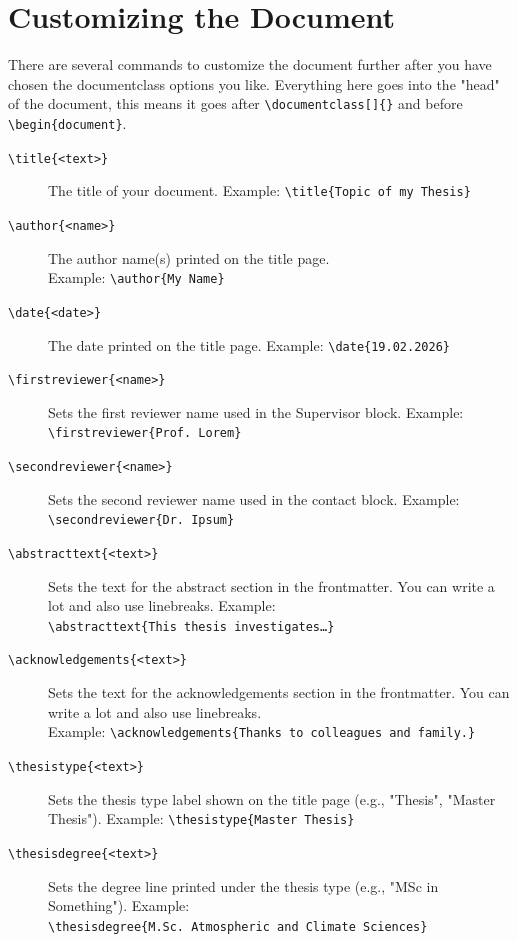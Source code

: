 \documentclass[12pt, todonotes, nodeclaration, oneside, fancypagenumbers, notof, notot, noabstract]{IAUthesis}
\newcommand{\code}[1]{\colorbox{black!10!white}{\texttt{#1}}}
\begin{document}
\chapter{Customizing the Document}
There are several commands to customize the document further after you have chosen the documentclass options you like. Everything here goes into the "head" of the document, this means it goes after \verb|\documentclass[]{}| and before \texttt{\textbackslash begin\{document\}}.

\begin{description} 
\item[\code{\textbackslash title\{<text>\}}] The title of your document. Example: \texttt{\textbackslash title\{Topic of my Thesis\}} 
\item[\code{\textbackslash author\{<name>\}}] The author name(s) printed on the title page.\\Example: \texttt{\textbackslash author\{My Name\}} 
\item[\code{\textbackslash date\{<date>\}}] The date printed on the title page. Example: \texttt{\textbackslash date\{19.02.2026\}} 
\item[\code{\textbackslash firstreviewer\{<name>\}}] Sets the first reviewer name used in the Supervisor block. Example: \texttt{\textbackslash firstreviewer\{Prof. Lorem\}} 
\item[\code{\textbackslash secondreviewer\{<name>\}}] Sets the second reviewer name used in the contact block. Example: \texttt{\textbackslash secondreviewer\{Dr. Ipsum\}} 
\item[\code{\textbackslash abstracttext\{<text>\}}] Sets the text for the abstract section in the frontmatter. You can write a lot and also use linebreaks. Example: \\\texttt{\textbackslash abstracttext\{This thesis investigates\dots\}} 
\item[\code{\textbackslash acknowledgements\{<text>\}}] Sets the text for the acknowledgements section in the frontmatter. You can write a lot and also use linebreaks.\\Example: \texttt{\textbackslash acknowledgements\{Thanks to colleagues and family.\}} 
\item[\code{\textbackslash thesistype\{<text>\}}] Sets the thesis type label shown on the title page (e.g., "Thesis", "Master Thesis"). Example: \texttt{\textbackslash thesistype\{Master Thesis\}} 
\item[\code{\textbackslash thesisdegree\{<text>\}}] Sets the degree line printed under the thesis type (e.g., "MSc in Something"). Example: \\\texttt{\textbackslash thesisdegree\{M.Sc. Atmospheric and Climate Sciences\}} 

\end{description}
\end{document}
